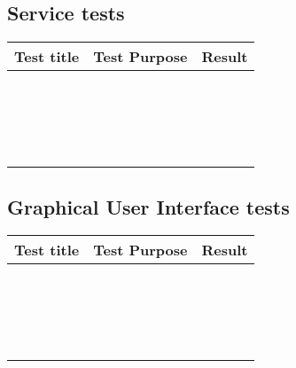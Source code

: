 \subsection{Service tests}
\label{Appendix_Test_Table_Service}
\begin{centering}
\begin{longtable}{| p{5 cm} | p{7 cm} | c |}
\hline
Test title & Test Purpose & Result\\
\hline
 & & \\
\hline
 & & \\
\hline
 & & \\
\hline
 & & \\
\hline
 & & \\
\hline
 & & \\
\hline
 & & \\
\hline
 & & \\
\hline
 & & \\
\hline
 & & \\
\hline
 & & \\
\hline
 & & \\
\hline
 & & \\
\hline
 & & \\
\hline
 & & \\
\hline
 & & \\
\hline
 & & \\
\hline
 & & \\
\hline
\end{longtable}
\end{centering}
\subsection{Graphical User Interface tests}
\label{Appendix_Test_Table_GUI}
\begin{centering}
\begin{longtable}{| p{5 cm} | p{7 cm} | c |}
\hline
Test title & Test Purpose & Result\\
\hline
 & & \\
\hline
 & & \\
\hline
 & & \\
\hline
 & & \\
\hline
 & & \\
\hline
 & & \\
\hline
 & & \\
\hline
 & & \\
\hline
 & & \\
\hline
 & & \\
\hline
 & & \\
\hline
 & & \\
\hline
 & & \\
\hline
 & & \\
\hline
 & & \\
\hline
 & & \\
\hline
 & & \\
\hline
 & & \\
\hline
\end{longtable}
\end{centering}
